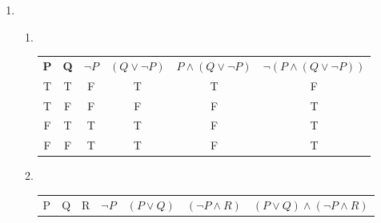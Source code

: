 \documentclass[12pt]{exam}
\begin{document}
\begin{enumerate}

    \addtocounter{enumi}{1}

    \item ~\\

        \begin{enumerate}

            \item ~\\
            
                \begin{table}[h]
                    \centering 
                    
                    \begin{tabular}{cccccc}
                        
                        \textbf{P} & \textbf{Q} & \textbf{$ \lnot P $} & \textbf{$ ( Q \lor \lnot P) $} & \textbf{$ P \land  ( Q \lor \lnot P)  $} & \textbf{$ \lnot (P \land  ( Q \lor \lnot P)) $}\\
                        
                        T       & T       & F       & T       &T       &F         \\
                        T       & F       & F       & F       &F       &T         \\
                        F       & T       & T       & T       &F       &T         \\
                        F       & F       & T       & T       &F       &T         \\
                        
                        
                    \end{tabular}
                \end{table}
            
            \item ~\\
            
                \begin{table}[h]
                    \centering 

                    \begin{tabular}{ccccccc}
                        
                        P & Q & R & \textbf{$ \lnot P $} & \textbf{$ ( P \lor Q ) $} & \textbf{$ (\lnot P \land R )  $} & \textbf{$  ( P \lor Q ) \land (\lnot P \land R ) $}\\
                        

\end{tabular}
\end{table}
\end{enumerate}
\end{enumerate}
\end{document}
